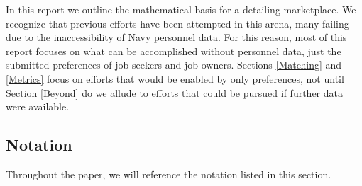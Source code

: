 In this report we outline the mathematical basis for a detailing marketplace. We recognize that previous efforts have been attempted in this arena, many failing due to the inaccessibility of Navy personnel data. For this reason, most of this report focuses on what can be accomplished without personnel data, just the submitted preferences of job seekers and job owners.  Sections \ref{Matching} and \ref{Metrics} focus on efforts that would be enabled by only preferences, not until Section \ref{Beyond} do we allude to efforts that could be pursued if further data were available.

\subsection{Notation}

Throughout the paper, we will reference the notation listed in this section.

